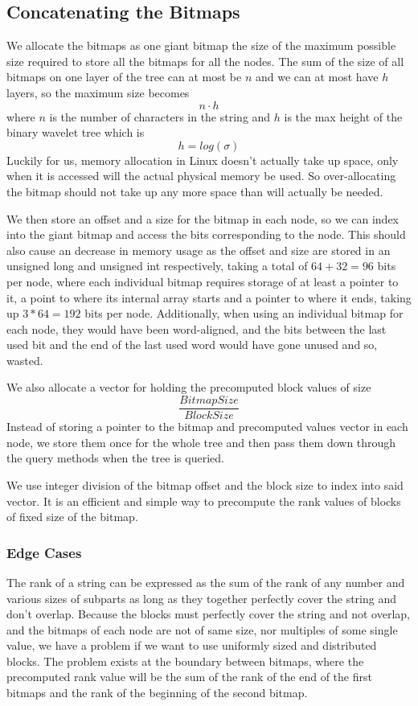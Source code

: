 \subsection{Concatenating the Bitmaps}
We allocate the bitmaps as one giant bitmap the size of the maximum possible size required to store all the bitmaps for all the nodes. The sum of the size of all bitmaps on one layer of the tree can at most be $n$ and we can at most have $h$ layers, so the maximum size becomes
\[n \cdot h\]
where $n$ is the number of characters in the string and $h$ is the max height of the binary wavelet tree which is
\[ h = log(\sigma) \]
Luckily for us, memory allocation in Linux doesn't actually take up space, only when it is accessed will the actual physical memory be used.
So over-allocating the bitmap should not take up any more space than will actually be needed.

We then store an offset and a size for the bitmap in each node, so we can index into the giant bitmap and access the bits corresponding to the node.
This should also cause an decrease in memory usage as the offset and size are stored in an unsigned long and unsigned int respectively, taking a total of $64+32=96$ bits per node, where each individual bitmap requires storage of at least a pointer to it, a point to where its internal array starts and a pointer to where it ends, taking up $3*64=192$ bits per node.
Additionally, when using an individual bitmap for each node, they would have been word-aligned, and the bits between the last used bit and the end of the last used word would have gone unused and so, wasted.

We also allocate a vector for holding the precomputed block values of size
\[ \frac{BitmapSize}{BlockSize} \]
Instead of storing a pointer to the bitmap and precomputed values vector in each node, we store them once for the whole tree and then pass them down through the query methods when the tree is queried.

We use integer division of the bitmap offset and the block size to index into said vector. It is an efficient and simple way to precompute the rank values of blocks of fixed size of the bitmap.


\subsubsection{Edge Cases}
\label{sec:rankQueriesWithPrecomputedRanksEdgeCases}
The rank of a string can be expressed as the sum of the rank of any number and various sizes of subparts as long as they together perfectly cover the string and don't overlap.
Because the blocks must perfectly cover the string and not overlap, and the bitmaps of each node are not of same size, nor multiples of some single value, we have a problem if we want to use uniformly sized and distributed blocks.
The problem exists at the boundary between bitmaps, where the precomputed rank value will be the sum of the rank of the end of the first bitmaps and the rank of the beginning of the second bitmap.

